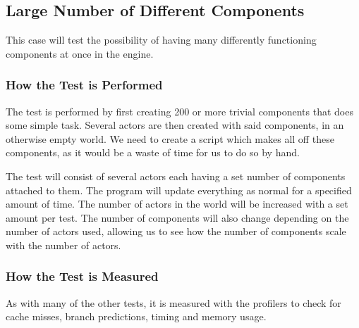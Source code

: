 \subsection{Large Number of Different Components}
This case will test the possibility of having many differently functioning components at once in the engine. 

\subsubsection*{How the Test is Performed}
The test is performed by first creating 200 or more trivial components that does some simple task. 
Several actors are then created with said components, in an otherwise empty world.
We need to create a script which makes all off these components, as it would be a waste of time for us to do so by hand.

The test will consist of several actors each having a set number of components attached to them.
The program will update everything as normal for a specified amount of time.
The number of actors in the world will be increased with a set amount per test.
The number of components will also change depending on the number of actors used, allowing us to see how the number of components scale with the number of actors.

\subsubsection*{How the Test is Measured}
As with many of the other tests, it is measured with the profilers to check for cache misses, branch predictions, timing and memory usage.
